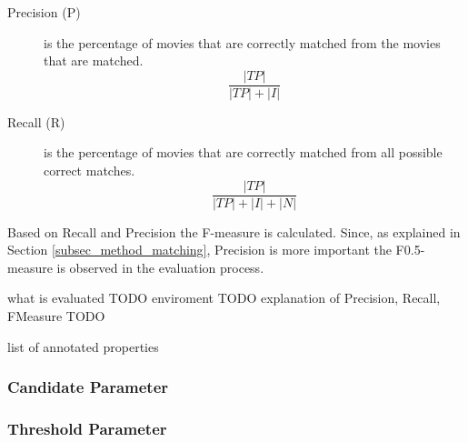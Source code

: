 \begin{description}
\item[Precision (P)] is the percentage of movies that are correctly matched from the movies that are matched.
\begin{equation}
\frac
{\left\lvert TP \right\rvert}
{\left\lvert TP \right\rvert + \left\lvert I \right\rvert}
\end{equation}
\item[Recall (R)] is the percentage of movies that are correctly matched from all possible correct matches.
\begin{equation}
\frac
{\left\lvert TP \right\rvert}
{\left\lvert TP \right\rvert + \left\lvert I \right\rvert + \left\lvert N \right\rvert}
\end{equation}
\end{description}

Based on Recall and Precision the F-measure is calculated. Since, as explained in Section \ref{subsec_method_matching}, Precision is more important the F0.5-measure is observed in the evaluation process.


what is evaluated TODO
enviroment TODO
explanation of Precision, Recall, FMeasure TODO

list of annotated properties 

\subsubsection{Candidate Parameter}
\subsubsection{Threshold Parameter}